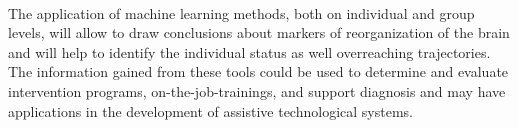 \\
The application of machine learning methods, both on individual and group levels, will allow to draw conclusions about markers of reorganization of the brain and will help to identify the individual status as well overreaching trajectories. The information gained from these tools could be used to determine and evaluate intervention programs, on-the-job-trainings, and support diagnosis and may have applications in the development of assistive technological systems. 